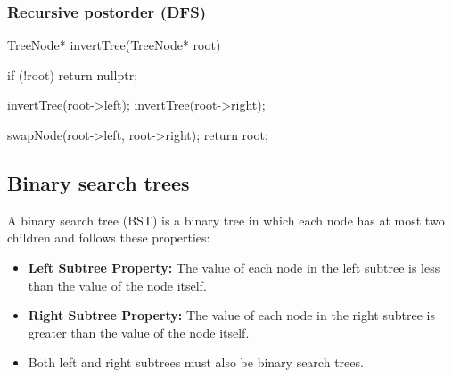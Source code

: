 \documentclass{report}
\begin{document}
\bigbreak \noindent 
\subsubsection{Recursive postorder (DFS)}
\bigbreak \noindent 
\begin{cppcode}
    TreeNode* invertTree(TreeNode* root) {
        if (!root) return nullptr;

        invertTree(root->left);
        invertTree(root->right);

        swapNode(root->left, root->right);
        return root;
    }
\end{cppcode}


\pagebreak 
{}
\bigbreak \noindent 
\subsection{Binary search trees}
\bigbreak \noindent 
A binary search tree (BST) is a binary tree in which each node has at most two children and follows these properties:
\begin{itemize}
    \item \textbf{Left Subtree Property:} The value of each node in the left subtree is less than the value of the node itself.
    \item \textbf{Right Subtree Property:} The value of each node in the right subtree is greater than the value of the node itself.
    \item Both left and right subtrees must also be binary search trees.
\end{itemize}
\bigbreak \noindent 
\end{document}
